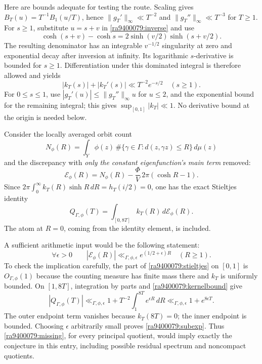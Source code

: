\documentclass[11pt]{article}
\begin{document}
Here are bounds adequate for testing the route. Scaling gives
$B_T(u)=T^{-1}B_1(u/T)$, hence
$\|g_T'\|_\infty\ll T^{-2}$ and
$\|g_T''\|_\infty\ll T^{-3}$ for $T\ge1$.
For $s\ge1$, substitute $u=s+v$ in \eqref{ra9400079:inverse} and use
\[
 \cosh(s+v)-\cosh s
   =2\sinh(v/2)\sinh(s+v/2).
\]
The resulting denominator has an integrable $v^{-1/2}$ singularity at zero
and exponential decay after inversion at infinity. Its logarithmic
$s$-derivative is bounded for $s\ge1$. Differentiation under this dominated
integral is therefore allowed and yields
\begin{equation}\label{ra9400079:kernelbound}
 |k_T(s)|+|k_T'(s)|\ll T^{-2}e^{-s/2}\quad(s\ge1).
\end{equation}
For $0\le s\le1$, use
$|g_T'(u)|\le\|g_T''\|_\infty u$ for $u\le2$, and the exponential
bound for the remaining integral; this gives $\sup_{[0,1]}|k_T|\ll1$.
No derivative bound at the origin is needed below.

Consider the locally averaged orbit count
\[
 N_\phi(R)=\int_Y\phi(z)\,
          \#\{\gamma\in\Gamma:d(z,\gamma z)\le R\}\,d\mu(z)
\]
and the discrepancy with \emph{only the constant eigenfunction's main term}
removed:
\begin{equation}\label{ra9400079:error}
 \mathcal E_\phi(R)=N_\phi(R)
       -\frac{\Phi}{V}\,2\pi(\cosh R-1).
\end{equation}
Since
$2\pi\int_0^\infty k_T(R)\sinh R\,dR=h_T(i/2)=0$, one has the exact
Stieltjes identity
\begin{equation}\label{ra9400079:stieltjes}
 Q_{\Gamma,\phi}(T)=\int_{[0,8T]}k_T(R)\,d\mathcal E_\phi(R).
\end{equation}
The atom at $R=0$, coming from the identity element, is included.

A sufficient arithmetic input would be the following statement:
\begin{equation}\label{ra9400079:missing}
 \boxed{\quad
 \forall\epsilon>0\qquad
 |\mathcal E_\phi(R)|\ll_{\Gamma,\phi,\epsilon}
           e^{(1/2+\epsilon)R}\quad(R\ge1).
 \quad}
\end{equation}
To check the implication carefully, the part of
\eqref{ra9400079:stieltjes} on $[0,1]$ is $O_{\Gamma,\phi}(1)$ because the
counting measure has finite mass there and $k_T$ is uniformly bounded.
On $[1,8T]$, integration by parts and \eqref{ra9400079:kernelbound} give
\[
 |Q_{\Gamma,\phi}(T)|
 \ll_{\Gamma,\phi,\epsilon}
 1+T^{-2}\int_1^{8T}e^{\epsilon R}\,dR
 \ll_{\Gamma,\phi,\epsilon}1+e^{8\epsilon T}.
\]
The outer endpoint term vanishes because $k_T(8T)=0$; the inner endpoint is
bounded. Choosing $\epsilon$ arbitrarily small proves
\eqref{ra9400079:subexp}. Thus \eqref{ra9400079:missing}, for every principal quotient,
would imply exactly the conjecture in this entry, including possible residual
spectrum and noncompact quotients.
\end{document}
